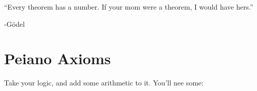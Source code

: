 \begin{center}
\enquote{Every theorem has a number. If your mom were a theorem, I would 
have hers.}
\begin{flushleft}
  -G\"{o}del
\end{flushleft}
\end{center}
\section{Peiano Axioms}
Take your logic, and add some 
arithmetic to it. You'll nee some:

